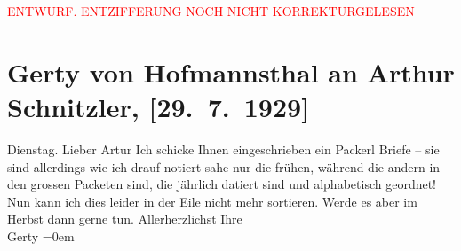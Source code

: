 
\begin{center}
            \textcolor{red}{ENTWURF. ENTZIFFERUNG NOCH NICHT KORREKTURGELESEN}
                      \end{center}
            
               \section[Gerty von Hofmannsthal an Arthur Schnitzler, {[}29. 7. 1929{]}]{ Gerty von Hofmannsthal an Arthur Schnitzler,
                    {[}29. 7. 1929{]}}\nopagebreak{}\rehead{ }\begin{ledgroupsized}[t]{13cm}\normalsize\beginnumbering{} \toendnotes[C]{\smallbreak\pagebreak[2]} 
\pstart
           \raggedleft{}{\pb}Dienstag.\pend
           \pstart{}Lieber Artur\pend\pstart
           Ich schicke Ihnen eingeschrieben ein Packerl Briefe – sie sind allerdings wie ich
                    drauf notiert sahe nur die frühen, während die andern in den grossen Packeten
                    sind, die jährlich datiert sind und alphabetisch geordnet!\pend
           \pstart
           Nun kann ich dies leider in der Eile nicht mehr sortieren. Werde es aber im
                    Herbst dann gerne tun. \pend
           \pstart
           Allerherzlichst Ihre{\\[\baselineskip]}\spacefill\mbox{Gerty}\pend
           \leftskip=0em{}\endnumbering{}\end{ledgroupsized}  \newcommand{\dateiname}{L02515}\newcommand{\titel}{Gerty von Hofmannsthal an Arthur Schnitzler, [29. 7. 1929]}\newcommand{\editorInnen}{Martin Anton Müller und Gerd-Hermann Susen}
      